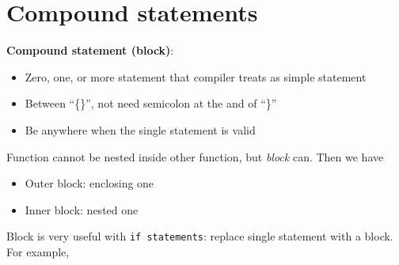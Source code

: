 \documentclass[
  letterpaper,
  DIV=11,
  numbers=noendperiod]{scrreprt}
\providecommand{\tightlist}{%
  \setlength{\itemsep}{0pt}\setlength{\parskip}{0pt}}\usepackage{longtable,booktabs,array}
\begin{document}
\hypertarget{compound-statements}{%
\section{Compound statements}\label{compound-statements}}

\textbf{Compound statement (block)}:

\begin{itemize}
\tightlist
\item
  Zero, one, or more statement that compiler treats as simple statement
\item
  Between ``\{\}'', not need semicolon at the and of ``\}''
\item
  Be anywhere when the single statement is valid
\end{itemize}

Function cannot be nested inside other function, but \emph{block} can.
Then we have

\begin{itemize}
\tightlist
\item
  Outer block: enclosing one
\item
  Inner block: nested one
\end{itemize}

Block is very useful with \texttt{if\ statements}: replace single
statement with a block. For example,
\end{document}
